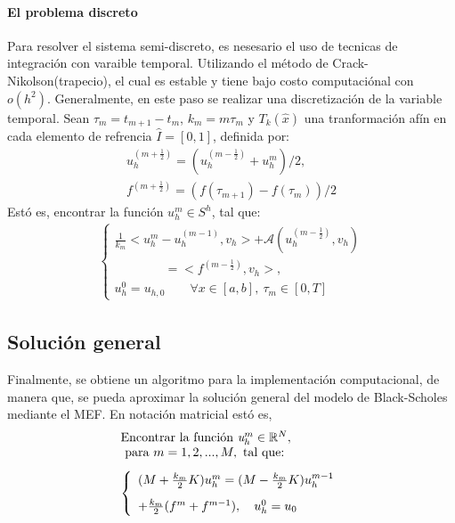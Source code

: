 \documentclass[12pt]{article}
\begin{document}
\paragraph{El problema discreto}
Para resolver el sistema semi-discreto, es nesesario el uso de tecnicas de integración con varaible temporal. Utilizando el método de Crack-Nikolson(trapecio), el cual es estable y tiene bajo costo computaciónal con $o(h^2)$. Generalmente, en este paso se realizar una discretización de la variable temporal. Sean  $\tau_m = t_{m+1}-t_m$, $k_m=m\tau_m$ y  $T_k(\hat{x})$ una tranformación afín en cada elemento de refrencia $\hat{I}=[0,1]$, definida por:
\begin{equation*}
\begin{array}{l}
u_h^{(m+\frac{1}{2})}=(u_h^{(m-\frac{1}{2})}+u_h^m)/2,\\[0.3cm]
f^{(m+\frac{1}{2})}=(f(\tau_{m+1})-f(\tau_{m}))/2
\end{array}
\end{equation*}
Estó es, encontrar la función $\textit{u}_h^m\in S^h$, tal que:
\begin{equation*}
\begin{array}{l}
\left\{
\begin{array}{l}
\frac{1}{k_m}<u_h^m-u_h^{(m-1)},v_h> + \mathcal{A}(u_h^{(m-\frac{1}{2})},v_h)\\
\qquad\qquad = <\textit{f}^{(m-\frac{1}{2})},v_h>,\\[0.3cm]
u_h^0 = u_{h,0}  \qquad \forall x \in [a,b], \ \tau_m \in [0,T]
\end{array}\right. 
\end{array}
\end{equation*}
\subsection{Solución general}
Finalmente, se obtiene un algoritmo para la implementación computacional, de manera que, se pueda aproximar la solución general del modelo de Black-Scholes mediante el MEF. En notación matricial estó es,
\begin{equation*}
\begin{array}{l}
\text{Encontrar la función } \textit{u}_h^m\in \mathbb{R}^N,\\
 \text{ para }m=1,2,...,M, \text{ tal que: }\\[0.3cm]
\left\{
\begin{array}{l}
({\LARGE M}+\frac{k_m}{2}{\LARGE K})u_h^m = ({\LARGE M}-\frac{k_m}{2}{\LARGE K})u_h^{m-1}\\[0.3cm]
+ \frac{k_m}{2}(f^m +f^{m-1}), \quad u_h^0 = u_0
\end{array}\right.\\
\end{array}
\label{Ecu:35}
\end{equation*}
\end{document}
